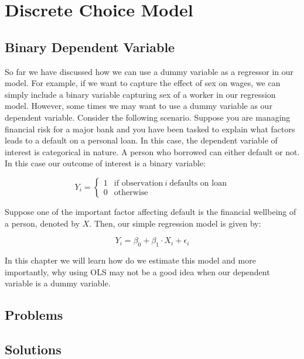 \documentclass[
]{book}
\theoremstyle{definition}
\theoremstyle{definition}
\theoremstyle{definition}
\theoremstyle{definition}
\theoremstyle{remark}
\begin{document}
\hypertarget{discrete-choice-model}{%
\chapter{Discrete Choice Model}\label{discrete-choice-model}}

\hypertarget{binary-dependent-variable}{%
\section{Binary Dependent Variable}\label{binary-dependent-variable}}

So far we have discussed how we can use a dummy variable as a regressor in our model. For example, if we want to capture the effect of sex on wages, we can simply include a binary variable capturing sex of a worker in our regression model. However, some times we may want to use a dummy variable as our dependent variable. Consider the following scenario. Suppose you are managing financial risk for a major bank and you have been tasked to explain what factors leads to a default on a personal loan. In this case, the dependent variable of interest is categorical in nature. A person who borrowed can either default or not. In this case our outcome of interest is a binary variable:

\[Y_i= \begin{cases}
1 & \text{if observation} \ i \ \text{defaults on loan} \\
0 & \text{otherwise}
\end{cases}\]

Suppose one of the important factor affecting default is the financial wellbeing of a person, denoted by \(X\). Then, our simple regression model is given by:

\[Y_i=\beta_0+\beta_1\cdot X_i +\epsilon_i\]

In this chapter we will learn how do we estimate this model and more importantly, why using OLS may not be a good idea when our dependent variable is a dummy variable.

\hypertarget{problems-5}{%
\section*{Problems}\label{problems-5}}

\hypertarget{solutions-5}{%
\section*{Solutions}\label{solutions-5}}
\end{document}
